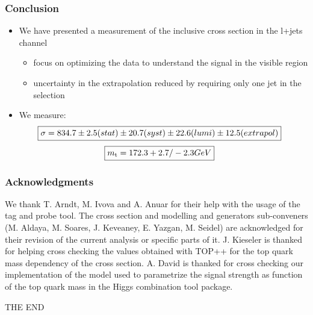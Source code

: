 \documentclass{beamer}
\begin{document}
\begin{frame}
\frametitle{Conclusion}
\begin{itemize}
\item We have presented a measurement of the inclusive cross section in the l+jets channel
\begin{itemize}
\item focus on optimizing the data to understand the signal in the visible region
\item uncertainty in the extrapolation reduced by requiring only one jet in the selection
\end{itemize}
\item We measure:
\begin{align}
\Aboxed{\sigma = 834.7 \pm 2.5 (stat) \pm 20.7 (syst) \pm 22.6 (lumi) \pm 12.5 (extrapol)}\nonumber
\end{align}
\vspace{-0.9cm}
\begin{align}
\Aboxed{m_\text{t} = 172.3 +2.7/-2.3 GeV}\nonumber
\end{align}
\end{itemize}
\end{frame}
\begin{frame}
\frametitle{Acknowledgments}
We thank T. Arndt, M. Ivova and A. Anuar for their help with the usage
of the tag and probe tool.
The cross section and modelling and generators sub-conveners
(M. Aldaya, M. Soares, J. Keveaney, E. Yazgan, M. Seidel)  are
acknowledged for their revision of
the current analysis or specific parts of it.
J. Kieseler is thanked for helping cross checking the values obtained
with {TOP++} for the top quark mass dependency of the cross
section.
A. David is thanked for cross checking our implementation of the model
used to parametrize the signal strength as function of the top quark
mass in the Higgs combination tool package.
\end{frame}
\begin{frame}
\Huge{\centerline{THE END}}
\end{frame}
\end{document}
